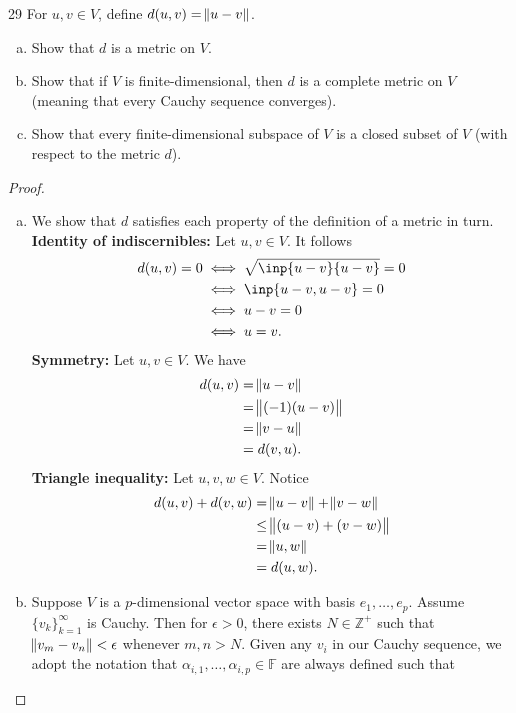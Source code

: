 \documentclass{extarticle}
\newenvironment{problem}[1]{\begin{prob*}{#1}{}}{\end{prob*}}
\newcommand{\Z}{\mathbb{Z}}
\newcommand{\F}{\mathbb{F}}
\begin{document}
\begin{problem}{29}
For $u,v \in V$, define $d(u,v) = \norm{u - v}$.  
\begin{enumerate}[(a)]
\item Show that $d$ is a metric on $V$.
\item Show that if $V$ is finite-dimensional, then $d$ is a complete metric on $V$ (meaning that every Cauchy sequence converges).
\item Show that every finite-dimensional subspace of $V$ is a closed subset of $V$ (with respect to the metric $d$).
\end{enumerate}
\end{problem}
\begin{proof}
\begin{enumerate}[(a)]
\item We show that $d$ satisfies each property of the definition of a metric in turn.\\
\textbf{Identity of indiscernibles: } Let $u, v\in V$.  It follows
\begin{align*}
d(u, v) = 0 &\iff \sqrt{\inp{u-v}{u-v}} = 0\\
&\iff \inp{u - v, u- v} = 0\\
&\iff u - v = 0\\
&\iff u = v.
\end{align*}
\textbf{Symmetry: } Let $u, v\in V$.  We have
\begin{align*}
d(u, v) &= \norm{u - v}\\
&= \norm{(-1)(u - v)}\\
&= \norm{v - u}\\
&= d(v, u).
\end{align*}
\textbf{Triangle inequality: } Let $u, v, w\in V$.  Notice
\begin{align*}
d(u,v) + d(v, w) &= \norm{u - v} + \norm{v - w}\\
&\leq \norm{(u - v) + (v - w)}\\
&= \norm{u, w}\\
&= d(u,w).
\end{align*}
\item Suppose $V$ is a $p$-dimensional vector space with basis $e_1,\dots, e_p$.  Assume $\{v_k\}_{k = 1}^\infty$ is Cauchy.  Then for $\epsilon > 0$, there exists $N\in\Z^+$ such that $\norm{v_m - v_n} < \epsilon$ whenever $m,n > N$.  Given any $v_i$ in our Cauchy sequence, we adopt the notation that $\alpha_{i, 1}, \dots, \alpha_{i, p}\in \F$ are always defined such that 
\begin{equation*}

\end{equation*}
\end{enumerate}
\end{proof}
\end{document}
